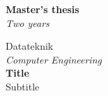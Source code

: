 \documentclass[12pt]{report}
\begin{document}

{\sffamily
{}
\begin{titlepage}
\begin{tcolorbox}

\vspace{38ex}
\hspace*{5.4ex} \LARGE{\textbf{Master's thesis}}\\
\hspace*{2.8ex} \textit{\Large{Two years}}\\
\vspace{3ex}

\hspace*{3ex} \small{Datateknik}\\
\hspace*{6.1ex} \textit{Computer Engineering}\\

\hspace*{6.4ex} \textbf{Title}\\
\hspace*{6.6ex} Subtitle\\


\end{tcolorbox}
\end{titlepage}}
\end{document}
